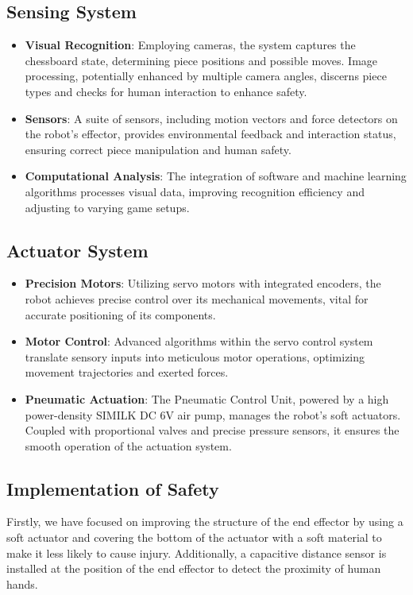 \documentclass[10pt, a4paper, twocolumn]{article}
\begin{document}
\subsection{Sensing System}

\begin{itemize}
    \item \textbf{Visual Recognition}: Employing cameras, the system captures the chessboard state, determining piece positions and possible moves. Image processing, potentially enhanced by multiple camera angles, discerns piece types and checks for human interaction to enhance safety.
    \item \textbf{Sensors}: A suite of sensors, including motion vectors and force detectors on the robot's effector, provides environmental feedback and interaction status, ensuring correct piece manipulation and human safety.
    \item \textbf{Computational Analysis}: The integration of software and machine learning algorithms processes visual data, improving recognition efficiency and adjusting to varying game setups.
\end{itemize}

\subsection{Actuator System}

\begin{itemize}
    \item \textbf{Precision Motors}: Utilizing servo motors with integrated encoders, the robot achieves precise control over its mechanical movements, vital for accurate positioning of its components.
    \item \textbf{Motor Control}: Advanced algorithms within the servo control system translate sensory inputs into meticulous motor operations, optimizing movement trajectories and exerted forces.
    \item \textbf{Pneumatic Actuation}: The Pneumatic Control Unit, powered by a high power-density SIMILK DC 6V air pump, manages the robot's soft actuators. Coupled with proportional valves and precise pressure sensors, it ensures the smooth operation of the actuation system.
\end{itemize}

\subsection{Implementation of Safety}
Firstly, we have focused on improving the structure of the end effector by using a soft actuator and covering the bottom of the actuator with a soft material to make it less likely to cause injury. Additionally, a capacitive distance sensor is installed at the position of the end effector to detect the proximity of human hands.
\end{document}
